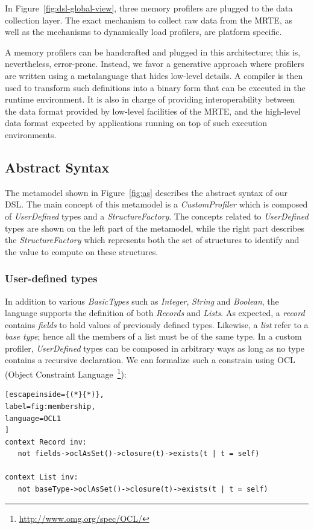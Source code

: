 In Figure~\ref{fig:dsl-global-view}, three memory profilers are plugged to the data collection layer.
The exact mechanism to collect raw data from the MRTE, as well as the mechanisms to dynamically load profilers, are platform specific.

A memory profilers can be handcrafted and plugged in this architecture; this is, nevertheless, error-prone.
Instead, we favor a generative approach where profilers are written using a metalanguage that hides low-level details.
A compiler is then used to transform such definitions into a binary form that can be executed in the runtime environment.
It is also in charge of providing interoperability between the data format provided by low-level facilities of the MRTE, and the high-level data format expected by applications running on top of such execution environments. 

\subsection{Abstract Syntax}\label{sec:abstract-syntax}

The metamodel shown in Figure~\ref{fig:as} describes the abstract syntax of our DSL.
The main concept of this metamodel is a \textit{CustomProfiler} which is composed of \textit{UserDefined} types and a \textit{StructureFactory}.
The concepts related to \textit{UserDefined} types are shown on the left part of the metamodel, while the right part describes the \textit{StructureFactory} which represents both the set of  structures to identify and the value to compute on these structures.

\subsubsection{User-defined types}
In addition to various \textit{BasicTypes} such as \textit{Integer}, \textit{String} and \textit{Boolean}, the language supports the definition of both \textit{Records} and \textit{Lists}.
As expected, a \textit{record} contains \textit{fields} to hold values of previously defined types.
Likewise, a \textit{list} refer to a \textit{base type}; hence all the members of a list must be of the same type.
In a custom profiler, \textit{UserDefined} types can be composed in arbitrary ways as long as no type contains a recursive declaration.
We can formalize such a constrain using OCL (Object Constraint Language~\footnote{\url{http://www.omg.org/spec/OCL/}}):

\begin{lstlisting}[escapeinside={(*}{*)},
label=fig:membership,
language=OCL1
]
context Record inv: 
   not fields->oclAsSet()->closure(t)->exists(t | t = self)

context List inv:
   not baseType->oclAsSet()->closure(t)->exists(t | t = self)
\end{lstlisting} 


